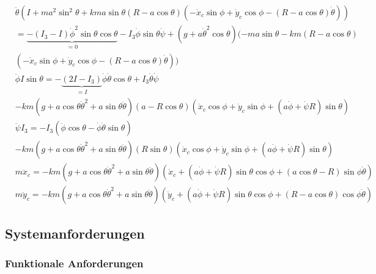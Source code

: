 {\begin{align*}
	&
	\ddot \theta (I+ma^2\sin^2\theta+kma\sin \theta(R-a\cos\theta)(-\dot x_c
	\sin\phi+\dot y_c \cos \phi-(R-a\cos\theta)\dot \theta))
	\\&
	=\underbrace{-(I_3-I)\dot \phi^2\sin\theta\cos\theta}_{=0}-I_3\dot \phi \sin \theta \dot \psi 
	+ (g+a\dot \theta^2\cos \theta)(-ma\sin\theta - km(R-a\cos \theta)
	\\&
	(-\dot x_c \sin \phi +\dot y_c \cos \phi-(R-a\cos\theta)\dot \theta))
\end{align*}
\begin{align*}
	&
	\ddot \phi I \sin\theta= -\underbrace{(2I-I_3)}_{=I}
	\dot \phi \dot \theta \cos \theta + I_3\dot \theta \dot \psi
	\\&
	-km(g+a\cos\theta\dot\theta^2+a\sin\theta\ddot\theta)
	(a-R\cos\theta)(\dot x_c\cos \phi +\dot y_c \sin\phi+
	(a\dot \phi+\dot \psi R)\sin \theta)
\end{align*}
\begin{align*}
	&\ddot \psi I_3=-I_3(\ddot \phi \cos \theta - \dot \phi \dot \theta \sin \theta)
	\\&
	-km(g+a\cos\theta\dot\theta^2+a \sin\theta\ddot \theta)(R\sin\theta)
	(\dot x_c\cos \phi +\dot y_c \sin \phi+(a\dot \phi +\dot \psi R)\sin\theta)
\end{align*}
\begin{align*}
	&m\ddot x_c=-km(g+a\cos\theta\dot \theta^2+a\sin \theta\ddot\theta)
	(\dot x_c+(a\dot \phi + \dot \psi R)\sin \theta\cos \phi+
	(a\cos \theta -R)\sin \phi \dot \theta)
\end{align*}
\begin{align*}
	&m\ddot y_c=-km(g+a\cos \theta\dot \theta^2+a \sin \theta \ddot \theta)
	(\dot y_c+(a\dot \phi + \dot \psi R)\sin \theta \cos \phi
	+(R-a\cos \theta)\cos\phi \dot \theta)
\end{align*} }

\subsection{Systemanforderungen}


\subsubsection{Funktionale Anforderungen}

